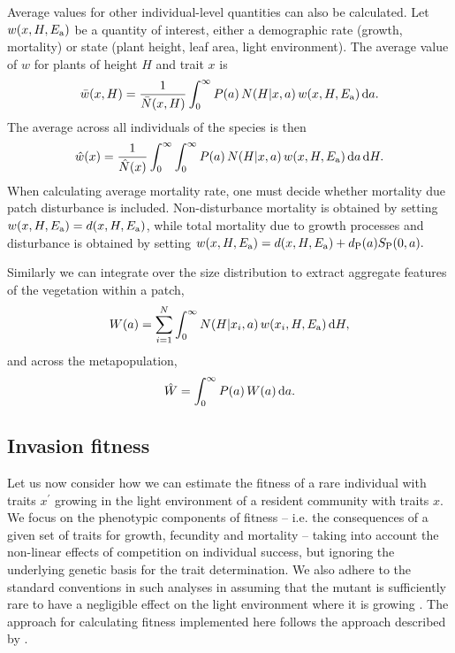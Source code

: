 \documentclass[10pt,twoside]{article}
\begin{document}
Average values for other individual-level quantities can also be calculated.
Let
\(w(x, H, E_{\rm a})\) be a quantity of interest, either a demographic rate
(growth, mortality) or state (plant height, leaf area, light environment).
The average value of \(w\) for plants of height $H$ and trait $x$ is
\begin{equation}\bar{w}(x, H) = \frac1{\bar{N}(x, H)}\int_{0}^{\infty}P(a) \, N(H | x, a) \, w(x, H, E_{\rm a}) \, {\rm d}a.
\end{equation}
The average across all individuals of the species is then
\begin{equation}
  \hat{w}(x) = \frac1{\hat{N}(x) }\int_{0}^{\infty} \int_{0}^{\infty}P(a) \, N(H | x, a) \, w(x, H, E_{\rm a}) \, {\rm d}a \, {\rm d}H.
\end{equation}
When calculating average mortality rate, one must decide whether
mortality due patch disturbance is included. Non-disturbance mortality
is obtained by setting \(w(x, H, E_{\rm a}) = d(x, H, E_{\rm a})\), while total
mortality due to growth processes and disturbance is obtained by setting
\(w(x, H, E_{\rm a}) = d(x, H, E_{\rm a}) + d_{\rm P}(a) S_{\rm P}(0, a).\)

Similarly we can integrate over the size distribution to extract aggregate
features of the vegetation within a patch,
\begin{equation}
  W(a) = \sum_{i = 1}^{N} \int_{0}^{\infty} N(H | x_i, a)\, w(x_i, H, E_{\rm a}) \, {\rm d}H,
\end{equation}
and across the metapopulation,
\begin{equation}
  \hat{W} = \int_{0}^{\infty} P(a) \, W(a) \, {\rm d}a.
\end{equation}

\subsection{Invasion fitness}\label{invasion-fitness}

Let us now consider how we can estimate the fitness of a rare individual
with traits \(x^\prime\) growing in the light environment of a resident
community with traits \(x\). We focus on the phenotypic components
of fitness -- i.e. the consequences of a given set of traits for growth,
fecundity and mortality -- taking into account the non-linear effects of
competition on individual success, but ignoring the underlying genetic
basis for the trait determination. We also adhere to the standard
conventions in such analyses in assuming that the mutant is sufficiently
rare to have a negligible effect on the light environment where it is growing \citep{Geitz-1998}.
The approach for calculating fitness implemented here follows the approach
described by \citep{Falster-2015}.
\end{document}
